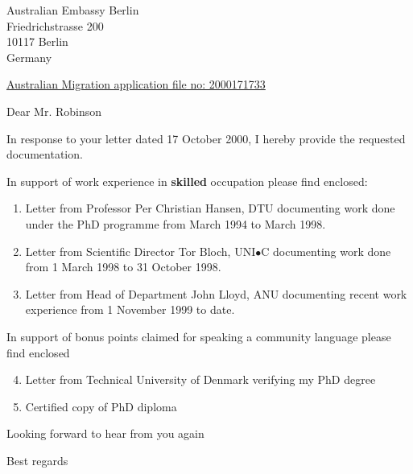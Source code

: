 \documentclass[12pt]{letter}
\begin{document}
\address{Ole M{\o}ller Nielsen     \\
         23 Wheeler Crescent   \\
         Wanniassa, ACT 2903 \\
         Canberra \\
         Australia}


\signature{Ole M{\o}ller Nielsen}

\begin{letter}
{Australian Embassy Berlin \\
 Friedrichstrasse 200 \\
 10117 Berlin \\
 Germany}
 
\opening{\underline{Australian Migration application file no: 2000171733}}

Dear Mr. Robinson

In response to your letter dated 17 October 2000, I
hereby provide the requested documentation.

In support of work experience in {\bf skilled} occupation
please find enclosed:
\begin{enumerate} 
  \item Letter from Professor Per Christian Hansen, DTU documenting
        work done under the PhD programme from March 1994 to March 1998.
  \item Letter from Scientific Director Tor Bloch, 
        UNI$\bullet$C documenting work done from
        1 March 1998 to 31 October 1998. 
  \item Letter from Head of Department John Lloyd, ANU 
        documenting recent work experience from 
        1 November 1999 to date.
\end{enumerate}

In support of bonus points claimed for speaking a community language please find enclosed
\begin{enumerate} 
  \setcounter{enumi}{3}
  \item Letter from Technical University of Denmark verifying my PhD degree
  \item Certified copy of PhD diploma
\end{enumerate}

Looking forward to hear from you again

\closing{Best regards}

\end{letter}
\end{document}
